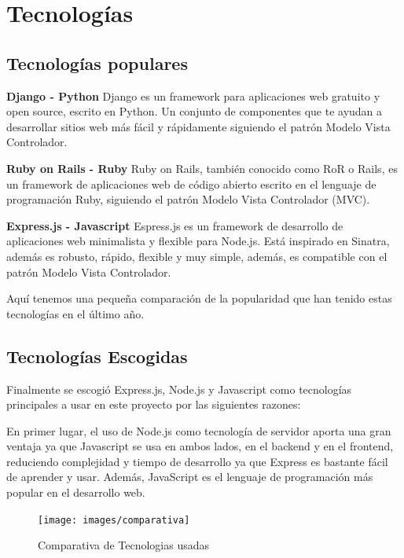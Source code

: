 
\section{Tecnologías}
\label{3:sec1}

\subsection{Tecnologías populares}
\label{3:1:1}
{\bf Django - Python}
Django es un framework para aplicaciones web gratuito y open source, escrito en Python. Un conjunto de componentes que te ayudan a desarrollar sitios web más fácil y rápidamente siguiendo el patrón Modelo Vista Controlador.

{\bf Ruby on Rails - Ruby}
Ruby on Rails, también conocido como RoR o Rails, es un framework de aplicaciones web de código abierto escrito en el lenguaje de programación Ruby, siguiendo el patrón Modelo Vista Controlador (MVC).

{\bf Express.js - Javascript}
Espress.js  es un framework de desarrollo de aplicaciones web minimalista y flexible para Node.js. Está inspirado en Sinatra, además es robusto, rápido, flexible y muy simple, además, es compatible con el patrón Modelo Vista Controlador.

Aquí tenemos una pequeña comparación de la popularidad que han tenido estas tecnologías en el último año.

\subsection{Tecnologías Escogidas}
\label{3:1:2}

Finalmente se escogió Express.js, Node.js y Javascript como tecnologías principales a usar en este proyecto por las siguientes razones:

En primer lugar, el uso de Node.js como tecnología de servidor aporta una gran ventaja ya que Javascript se usa en ambos lados, en el backend y en el frontend, reduciendo complejidad y tiempo de desarrollo ya que Express es bastante fácil de aprender y usar. Además, JavaScript es el lenguaje de programación más popular en el desarrollo web.

\begin{figure}[!th]
\begin{center}
\texttt{[image: images/comparativa]}
\caption{Comparativa de Tecnologias usadas}
\label{fig:Comparativa de Tecnologias usadas}
\end{center}
\end{figure}

